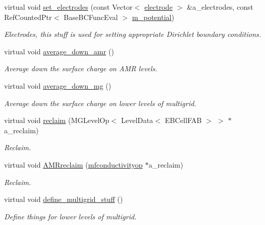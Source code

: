 \begin{DoxyCompactItemize}
virtual void \hyperlink{classmfconductivityopfactory_ab458eb1cff3cb2144c59ca6d57c1c718}{set\+\_\+electrodes} (const Vector$<$ \hyperlink{classelectrode}{electrode} $>$ \&a\+\_\+electrodes, const Ref\+Counted\+Ptr$<$ Base\+B\+C\+Func\+Eval $>$ \hyperlink{classmfconductivityopfactory_ad5f2b079d2b6b3bf4bcf3cb21609484d}{m\+\_\+potential})
\begin{DoxyCompactList}\small\item\em Electrodes, this stuff is used for setting appropriate Dirichlet boundary conditions. \end{DoxyCompactList}\item 
virtual void \hyperlink{classmfconductivityopfactory_a5aecffaf94f33075df564e70949a44d6}{average\+\_\+down\+\_\+amr} ()
\begin{DoxyCompactList}\small\item\em Average down the surface charge on A\+MR levels. \end{DoxyCompactList}\item 
virtual void \hyperlink{classmfconductivityopfactory_ac444993e1dae6d91e3ebf5ca8b0f605a}{average\+\_\+down\+\_\+mg} ()
\begin{DoxyCompactList}\small\item\em Average down the surface charge on lower levels of multigrid. \end{DoxyCompactList}\item 
virtual void \hyperlink{classmfconductivityopfactory_a15ade5e52fc1458778aa96304de287f5}{reclaim} (M\+G\+Level\+Op$<$ Level\+Data$<$ E\+B\+Cell\+F\+AB $>$ $>$ $\ast$a\+\_\+reclaim)
\begin{DoxyCompactList}\small\item\em Reclaim. \end{DoxyCompactList}\item 
virtual void \hyperlink{classmfconductivityopfactory_aad8a0e544a5e7ab42037bf44cf5a462e}{A\+M\+Rreclaim} (\hyperlink{classmfconductivityop}{mfconductivityop} $\ast$a\+\_\+reclaim)
\begin{DoxyCompactList}\small\item\em Reclaim. \end{DoxyCompactList}\item 
virtual void \hyperlink{classmfconductivityopfactory_a1664ca69279148643e7b1ae0597e075c}{define\+\_\+multigrid\+\_\+stuff} ()
\begin{DoxyCompactList}\small\item\em Define things for lower levels of multigrid. \end{DoxyCompactList}\item 

\end{DoxyCompactItemize}
